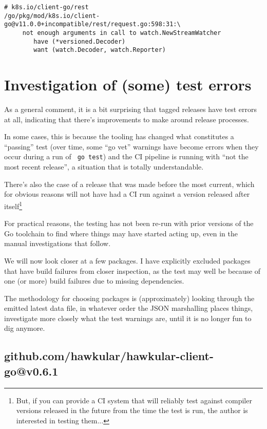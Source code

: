 \documentclass[a4paper]{paper}
\begin{document}
\begin{verbatim}
# k8s.io/client-go/rest
/go/pkg/mod/k8s.io/client-go@v11.0.0+incompatible/rest/request.go:598:31:\
     not enough arguments in call to watch.NewStreamWatcher
        have (*versioned.Decoder)
        want (watch.Decoder, watch.Reporter)
\end{verbatim}


\section{Investigation of (some) test errors}

As a general comment, it is a bit surprising that tagged releases have
test errors at all, indicating that there's improvements to make
around release processes.

In some cases, this is because the tooling
has changed what constitutes a ``passing'' test (over time, some ``go
vet'' warnings have become errors when they occur during a run of {\tt
  go test}) and the CI pipeline is running with ``not the most recent
release'', a situation that is totally understandable.

There's also the case of a release
that was made before the most current, which for obvious reasons will
not have had a CI run against a version released after
itself\footnote{But, if you can provide a CI system that will reliably
  test against compiler versions released in the future from the time
  the test is run, the author is interested in testing them...}

For practical reasons, the testing has not been re-run with prior
versions of the Go toolchain to find where things may have started
acting up, even in the manual investigations that follow.

We will now look closer at a few packages. I have explicitly excluded
packages that have build failures from closer inspection, as the test
may well be because of one (or more) build failures due to missing
dependencies.

The methodology for choosing packages is (approximately) looking
through the emitted latest data file, in whatever order the JSON
marshalling places things, investigate more closely what the test
warnings are, until it is no longer fun to dig anymore.

\subsection{github.com/hawkular/hawkular-client-go@v0.6.1}
\end{document}
